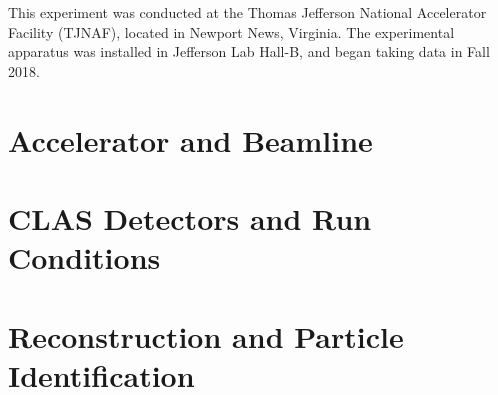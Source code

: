 This experiment was conducted at the Thomas Jefferson National Accelerator Facility (TJNAF), located in Newport News, Virginia. The experimental apparatus was installed in Jefferson Lab Hall-B, and began taking data in Fall 2018. 

\section{Accelerator and Beamline}
                  


\section{CLAS Detectors and Run Conditions}\label{sec:clas12exp}
    


\section{Reconstruction and Particle Identification}
    







